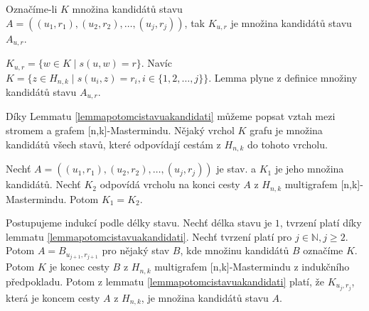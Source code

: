 \begin{lemma}\label{lemmapotomcistavuakandidati}
    Označíme-li $K$ množina kandidátů stavu $A = \left((u_1, r_1), (u_2,r_2), \dots, (u_j,r_j)\right)$, tak $K_{u,r}$ je množina kandidátů stavu $A_{u,r}$.
\end{lemma}
\begin{dukaz}
    $K_{u,r} = \{w \in K \mid s(u,w) = r\}$. Navíc $K = \{z \in H_{n,k} \mid s(u_i,z) = r_i,  i \in \{1,2,\dots ,j\} \}$. Lemma plyne z definice množiny kandidátů stavu $A_{u,r}$.
\end{dukaz}

Díky Lemmatu \ref{lemmapotomcistavuakandidati} můžeme popsat vztah mezi stromem a grafem [n,k]-Mastermindu. Nějaký vrchol $K$ grafu je množina kandidátů všech stavů, které odpovídají cestám z $H_{n,k}$ do tohoto vrcholu. 

\begin{tvrz}\label{tvrzenimultigrafastrom}
    Nechť $A = \left((u_1, r_1), (u_2,r_2), \dots, (u_j,r_j)\right)$ je stav. a $K_1$ je jeho množina kandidátů. Nechť $K_2$ odpovídá vrcholu na konci cesty $A$ z $H_{n,k}$ multigrafem [n,k]-Mastermindu. Potom $K_1 = K_2$.  
\end{tvrz}
\begin{dukaz}
    Postupujeme indukcí podle délky stavu. Nechť délka stavu je $1$, tvrzení platí díky lemmatu \ref{lemmapotomcistavuakandidati}. Nechť tvrzení platí pro $j\in \mathbb{N}, j\geq 2$. Potom $A = B_{u_{j+1}, r_{j+1}}$ pro nějaký stav $B$, kde množinu kandidátů $B$ označíme $K$. Potom $K$ je konec cesty $B$ z $H_{n,k}$ multigrafem [n,k]-Mastermindu z indukčního předpokladu. Potom z lemmatu \ref{lemmapotomcistavuakandidati} platí, že $K_{u_j, r_j}$, která je koncem cesty $A$ z $H_{n,k}$, je množina kandidátů stavu $A$. 
\end{dukaz}


